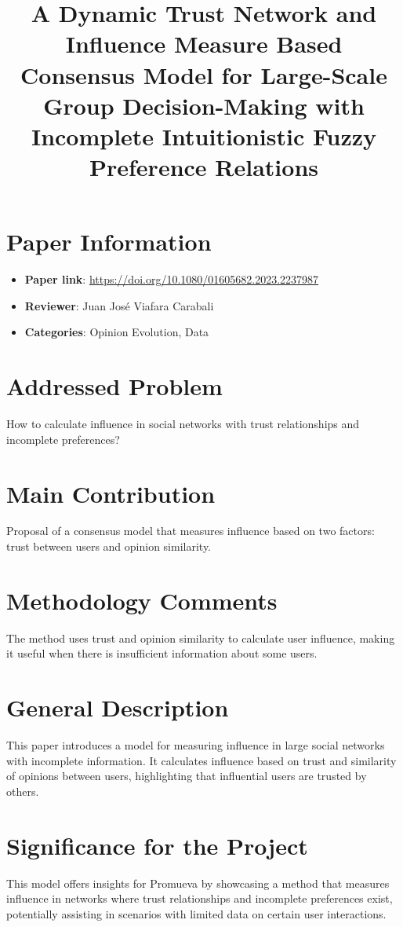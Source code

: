 \documentclass{article}
\title{A Dynamic Trust Network and Influence Measure Based Consensus Model for Large-Scale Group Decision-Making with Incomplete Intuitionistic Fuzzy Preference Relations}
\author{}
\date{}
\begin{document}
\maketitle

\section*{Paper Information}
\begin{itemize}
    \item \textbf{Paper link}: \url{https://doi.org/10.1080/01605682.2023.2237987}
    \item \textbf{Reviewer}: Juan José Viafara Carabali
    \item \textbf{Categories}: Opinion Evolution, Data
\end{itemize}

\section*{Addressed Problem}
How to calculate influence in social networks with trust relationships and incomplete preferences?

\section*{Main Contribution}
Proposal of a consensus model that measures influence based on two factors: trust between users and opinion similarity.

\section*{Methodology Comments}
The method uses trust and opinion similarity to calculate user influence, making it useful when there is insufficient information about some users.

\section*{General Description}
This paper introduces a model for measuring influence in large social networks with incomplete information. It calculates influence based on trust and similarity of opinions between users, highlighting that influential users are trusted by others.

\section*{Significance for the Project}
This model offers insights for Promueva by showcasing a method that measures influence in networks where trust relationships and incomplete preferences exist, potentially assisting in scenarios with limited data on certain user interactions.
\end{document}
